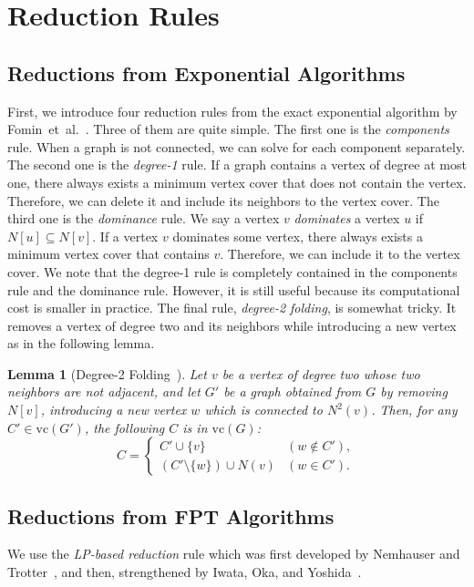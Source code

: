 \documentclass[11pt]{article}
\newcommand{\vc}{\mathrm{vc}}
\newtheorem{lemma}{Lemma}
\begin{document}
 \section{Reduction Rules}
\label{sec:reduction}

\subsection{Reductions from Exponential Algorithms}\label{sec:reduction:exponential}

First, we introduce four reduction rules from the exact exponential algorithm by
Fomin~et~al.~\cite{vc_reduction/measure_and_conquer}.
Three of them are quite simple.
The first one is the \emph{components} rule.
When a graph is not connected, we can solve for each component separately.
The second one is the \emph{degree-1} rule.
If a graph contains a vertex of degree at most one, there always exists a
minimum vertex cover that does not contain the vertex.
Therefore, we can delete it and include its neighbors to the vertex cover.
The third one is the \emph{dominance} rule.
We say a vertex $v$ \emph{dominates} a vertex $u$ if $N[u]\subseteq N[v]$.
If a vertex $v$ dominates some vertex, there always exists a minimum vertex cover that contains $v$.
Therefore, we can include it to the vertex cover.
We note that the degree-1 rule is completely
contained in the components rule and the
dominance rule.
However, it is still useful because its computational cost is smaller in practice.
The final rule, \textit{degree-2 folding}, is somewhat tricky.
It removes a vertex of degree two and its neighbors while introducing a new
vertex as in the following lemma.
\begin{lemma}[Degree-2
Folding~\cite{vc_reduction/measure_and_conquer}]
Let $v$ be a vertex of degree two whose two neighbors are not adjacent, and let $G'$
be a graph obtained from $G$ by removing $N[v]$, introducing a new vertex $w$ which is connected to $N^2(v)$.
Then, for any $C'\in\vc(G')$, the following $C$ is in $\vc(G)$:
\begin{equation*}
C=\begin{cases}
C'\cup\{v\}&(w\not\in C'),\\
(C'\setminus\{w\})\cup N(v)&(w\in C').
\end{cases}
\end{equation*}
\end{lemma}



\subsection{Reductions from FPT Algorithms}\label{sec:reduction:lp}
We use the \emph{LP-based reduction} rule which was first developed by Nemhauser
and Trotter~\cite{NemhauserT75}, and then, strengthened by Iwata, Oka, and
Yoshida~\cite{bip2/iwata14}.
\end{document}
